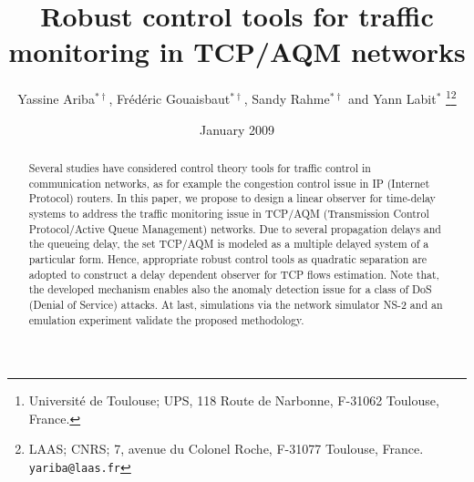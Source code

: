 \documentclass[a4paper, 10pt, onecolumn]{article}
\title{\LARGE \bf
Robust control tools for traffic monitoring in TCP/AQM networks
}
\author{Yassine Ariba$^{\ast\dag}$, Fr\'ed\'eric Gouaisbaut$^{\ast\dag}$, Sandy Rahme$^{\ast\dag}$ and Yann Labit$^{\ast}$ \thanks{ Universit\'e de Toulouse; UPS, 118 Route de Narbonne, F-31062 Toulouse, France.}\thanks{ LAAS; CNRS;  7, avenue du Colonel Roche, F-31077 Toulouse, France.
        {\tt\small yariba@laas.fr}}}
\date{January 2009}
\begin{document}
\maketitle
\thispagestyle{empty}
\pagestyle{empty}


\begin{abstract}
Several studies have considered control theory tools for traffic control in communication networks, as for example the congestion control issue in IP (Internet Protocol) routers. In this paper, we propose to design a linear observer for time-delay systems to address the traffic monitoring issue in TCP/AQM (Transmission Control Protocol/Active Queue Management) networks. Due to several propagation delays and the queueing delay, the set TCP/AQM is modeled as a multiple delayed system of a particular form. Hence, appropriate robust control tools as quadratic separation are adopted to construct a delay dependent observer for TCP flows estimation. Note that, the developed mechanism enables also the anomaly detection issue for a class of DoS (Denial of Service) attacks. At last, simulations via the network simulator NS-2 and an emulation experiment validate the proposed methodology.

\end{abstract}
\end{document}
